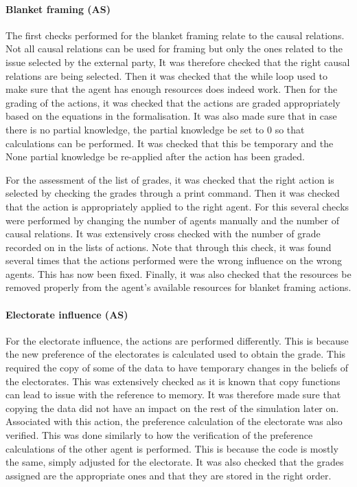 %
\paragraph{Blanket framing (AS)}

The first checks performed for the blanket framing relate to the causal relations. Not all causal relations can be used for framing but only the ones related to the issue selected by the external party, It was therefore checked that the right causal relations are being selected. Then it was checked that the while loop used to make sure that the agent has enough resources does indeed work. Then for the grading of the actions, it was checked that the actions are graded appropriately based on the equations in the formalisation. It was also made sure that in case there is no partial knowledge, the partial knowledge be set to 0 so that calculations can be performed. It was checked that this be temporary and the None partial knowledge be re-applied after the action has been graded.

For the assessment of the list of grades, it was checked that the right action is selected by checking the grades through a print command. Then it was checked that the action is appropriately applied to the right agent. For this several checks were performed by changing the number of agents manually and the number of causal relations. It was extensively cross checked with the number of grade recorded on in the lists of actions. Note that through this check, it was found several times that the actions performed were the wrong influence on the wrong agents. This has now been fixed. Finally, it was also checked that the resources be removed properly from the agent’s available resources for blanket framing actions.

%
\paragraph{Electorate influence (AS)}

For the electorate influence, the actions are performed differently. This is because the new preference of the electorates is calculated used to obtain the grade. This required the copy of some of the data to have temporary changes in the beliefs of the electorates. This was extensively checked as it is known that copy functions can lead to issue with the reference to memory. It was therefore made sure that copying the data did not have an impact on the rest of the simulation later on. Associated with this action, the preference calculation of the electorate was also verified. This was done similarly to how the verification of the preference calculations of the other agent is performed. This is because the code is mostly the same, simply adjusted for the electorate. It was also checked that the grades assigned are the appropriate ones and that they are stored in the right order.

